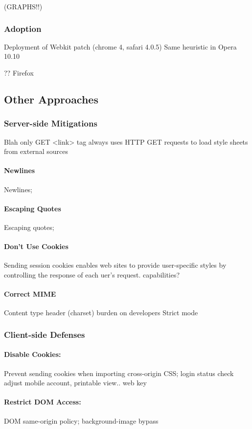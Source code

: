 \documentclass{acm_proc_article-sp}
\begin{document}
(GRAPHS!!)

\subsubsection{Adoption}
Deployment of Webkit patch (chrome 4, safari 4.0.5)
Same heuristic in Opera 10.10

?? Firefox

\subsection{Other Approaches}

\subsubsection{Server-side Mitigations}
Blah
only GET
<link> tag always uses HTTP GET requests to load style sheets from external sources

\paragraph{Newlines}
Newlines;
\paragraph{Escaping Quotes}
Escaping quotes;
\paragraph{Don't Use Cookies}
Sending session cookies enables web sites to provide user-specific styles by controlling the response of each uer's request.
capabilities?
\paragraph{Correct MIME}
Content type header (charset)
burden on developers
Strict mode

\subsubsection{Client-side Defenses}
\paragraph{Disable Cookies:}
Prevent sending cookies when importing cross-origin CSS;
login status check
adjust mobile account, printable view..
web key

\paragraph{Restrict DOM Access:}
DOM same-origin policy;
background-image bypass
\end{document}
